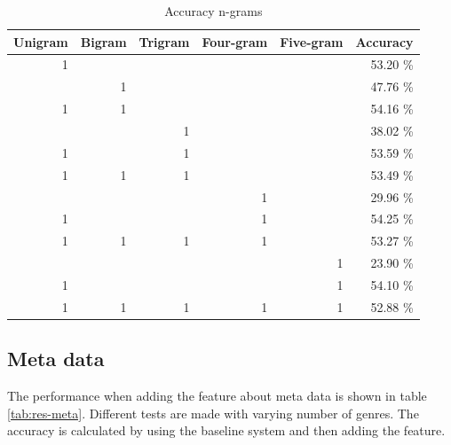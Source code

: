 \documentclass[a4paper, 12pt]{article}
\begin{document}
\begin{table}[h]
\begin{center}
    \begin{tabular}{| r | r | r | r | r | r |}
        \hline
        Unigram & Bigram & Trigram & Four-gram & Five-gram & Accuracy \\
        \hline
        1 &   &   &   &   & 53.20 \% \\ \hline
          & 1 &   &   &   & 47.76 \% \\ \hline
        \rowcolor{Green}
        1 & 1 &   &   &   & 54.16 \% \\ \hline
          &   & 1 &   &   & 38.02 \% \\ \hline
        \rowcolor{Green}
        1 &   & 1 &   &   & 53.59 \% \\ \hline
        \rowcolor{Green}
        1 & 1 & 1 &   &   & 53.49 \% \\ \hline
          &   &   & 1 &   & 29.96 \% \\ \hline
        \rowcolor{Green}
        1 &   &   & 1 &   & 54.25 \% \\ \hline
        \rowcolor{Green}
        1 & 1 & 1 & 1 &   & 53.27 \% \\ \hline
          &   &   &   & 1 & 23.90 \% \\ \hline
        \rowcolor{Green}
        1 &   &   &   & 1 & 54.10 \% \\ \hline
        1 & 1 & 1 & 1 & 1 & 52.88 \% \\ \hline
    \end{tabular}
    \caption{Accuracy n-grams}
    \label{tab:res-ngram}
\end{center}
\end{table}

\subsection{Meta data}
The performance when adding the feature about meta data is shown in table \ref{tab:res-meta}.
Different tests are made with varying number of genres.
The accuracy is calculated by using the baseline system and then adding the feature.
\end{document}
